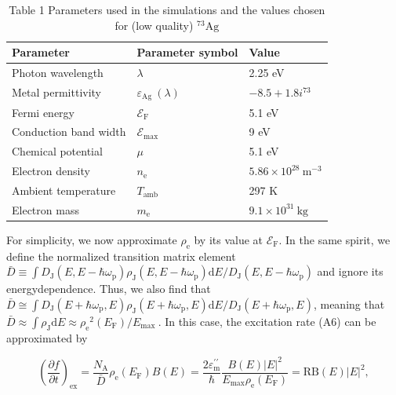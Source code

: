 \documentclass[10pt]{article}
\begin{document}
\begin{table}[h]
\begin{center}
\captionsetup{labelformat=empty}
\caption{Table 1 Parameters used in the simulations and the values chosen for (low quality) ${ }^{73} \mathrm{Ag}$}
\begin{tabular}{|l|l|l|}
\hline
Parameter & Parameter symbol & Value \\
\hline
Photon wavelength & $\lambda$ & 2.25 eV \\
\hline
Metal permittivity & $\varepsilon_{\text {Ag }}(\lambda)$ & $-8.5+1.8 i^{73}$ \\
\hline
Fermi energy & $\mathcal{E}_{\mathrm{F}}$ & 5.1 eV \\
\hline
Conduction band width & $\mathcal{E}_{\text {max }}$ & 9 eV \\
\hline
Chemical potential & $\mu$ & 5.1 eV \\
\hline
Electron density & $n_{\mathrm{e}}$ & $5.86 \times 10^{28} \mathrm{~m}^{-3}$ \\
\hline
Ambient temperature & $T_{\text {amb }}$ & 297 K \\
\hline
Electron mass & $m_{\mathrm{e}}$ & $9.1 \times 10^{31} \mathrm{~kg}$ \\
\hline
\end{tabular}
\end{center}
\end{table}

For simplicity, we now approximate $\rho_{\mathrm{e}}$ by its value at $\mathcal{E}_{\mathrm{F}}$. In the same spirit, we define the normalized transition matrix element $\bar{D} \equiv \int D_{\mathrm{J}}\left(E, E-\hbar \omega_{\mathrm{p}}\right) \rho_{\mathrm{J}}\left(E, E-\hbar \omega_{\mathrm{p}}\right) \mathrm{d} E / D_{\mathrm{J}}\left(E, E-\hbar \omega_{\mathrm{p}}\right)$ and ignore its energydependence. Thus, we also find that $\bar{D} \cong \int D_{\mathrm{J}}\left(E+\hbar \omega_{\mathrm{p}}, E\right) \rho_{\mathrm{J}}\left(E+\hbar \omega_{\mathrm{p}}, E\right) \mathrm{d} E / D_{\mathrm{J}}\left(E+\hbar \omega_{\mathrm{p}}, E\right)$, meaning that $\bar{D} \approx \int \rho_{\mathrm{J}} \mathrm{d} E \approx \rho_{\mathrm{e}}{ }^{2}\left(E_{\mathrm{F}}\right) / E_{\text {max }}$. In this case, the excitation rate (A6) can be approximated by


\begin{equation*}
\left(\frac{\partial f}{\partial t}\right)_{\mathrm{ex}}=\frac{N_{\mathrm{A}}}{\bar{D}} \rho_{\mathrm{e}}\left(E_{\mathrm{F}}\right) B(E)=\frac{2 \varepsilon_{\mathrm{m}}^{\prime \prime}}{\hbar} \frac{B(E)|E|^{2}}{E_{\max } \rho_{\mathrm{e}}\left(E_{\mathrm{F}}\right)}=\mathrm{RB}(E)|E|^{2}, \tag{A7}
\end{equation*}
\end{document}
